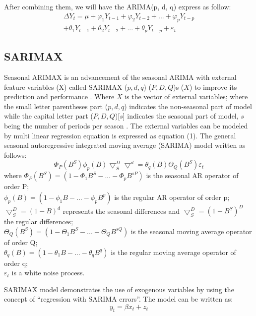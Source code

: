 \documentclass{ieeeojies}
\begin{document}
After combining them, we will have the ARIMA(p, d, q) express as follow:
\begin{equation}
    \begin{aligned}
        \Delta Y_t = \mu + \varphi_1Y_{t-1} + \varphi_2Y_{t-2} + ... +\varphi_pY_{t-p} \\
        + \theta_1Y_{t-1} + \theta_2Y_{t-2} + ... + \theta_pY_{t-p} + \varepsilon_t
    \end{aligned}
\end{equation}

\subsection{SARIMAX}
Seasonal ARIMAX is an advancement of the seasonal ARIMA with external feature variables (X) called SARIMAX ($p, d, q$) ($P,D,Q$)s ($X$) to improve its prediction and performance \cite{b9}. Where $X$ is the vector of external variables; where the small letter parentheses part ($p,d,q$) indicates the non-seasonal part of model while the capital letter part ($P,D,Q$)[$s$] indicates the seasonal part of model, $s$ being the number of periods per season \cite{b4}. The external variables can be modeled by multi linear regression equation is expressed as equation (1). The general seasonal autoregressive integrated moving average (SARIMA) model written as follows:
\begin{equation}
    \Phi_P(B^S)\phi_p(B)\bigtriangledown_S^D\bigtriangledown^d = \theta_q(B)\Theta_Q(B^S)\varepsilon_t
\end{equation}
where $\Phi_P(B^S) = (1 - \Phi_1B^S - ... - \Phi_pB^{sP})$ is the seasonal AR operator of order P;\\
$\phi_p(B) = (1 - \phi_1B - ... - \phi_pB^p)$ is the regular AR operator of order p; $\bigtriangledown_S^D = (1 - B)^d$ represents the seasonal differences and $\bigtriangledown_S^D = (1 - B^S)^D$ the regular differences;\\
$\Theta_Q(B^S) = (1 - \Theta_1B^S - ... - \Theta_QB^{sQ})$ is the seasonal moving average operator of order Q; \\
$\theta_q(B) = (1 - \theta_1B - ... - \theta_qB^q) $ is the regular moving average operator of order q;\\
$\varepsilon_t$ is a white noise process.

SARIMAX model demonstrates the use of exogenous variables by using the concept of “regression with SARIMA errors”. The model can be written as:
\begin{equation}
    y_t = \beta x_t + z_t
\end{equation}
\end{document}
